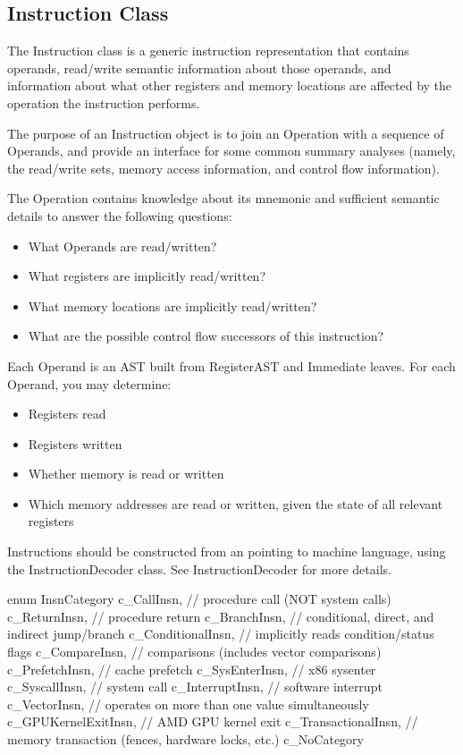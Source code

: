\subsection{Instruction Class}
\label{sec:instruction}
The Instruction class is a generic instruction representation that contains
operands, read/write semantic information about those operands, and information
about what other registers and memory locations are affected by the operation
the instruction performs.

The purpose of an Instruction object is to join an Operation with a sequence of
Operands, and provide an interface for some common summary analyses (namely, the
read/write sets, memory access information, and control flow information).

The Operation contains knowledge about its mnemonic and sufficient semantic
details to answer the following questions:
\begin{itemize}
\item What Operands are read/written?
\item What registers are implicitly read/written?
\item What memory locations are implicitly read/written?
\item What are the possible control flow successors of this instruction?
\end{itemize}

Each Operand is an AST built from RegisterAST and Immediate leaves. For each Operand, you may determine:
\begin{itemize}
\item Registers read
\item Registers written
\item Whether memory is read or written
\item Which memory addresses are read or written, given the state of all relevant registers
\end{itemize}

Instructions should be constructed from an  
pointing to machine language, using the InstructionDecoder class.  See
InstructionDecoder for more details. 

\begin{apient}
enum InsnCategory {
  c_CallInsn,          // procedure call (NOT system calls)
  c_ReturnInsn,        // procedure return
  c_BranchInsn,        // conditional, direct, and indirect jump/branch
  c_ConditionalInsn,   // implicitly reads condition/status flags
  c_CompareInsn,       // comparisons (includes vector comparisons)
  c_PrefetchInsn,      // cache prefetch
  c_SysEnterInsn,      // x86 sysenter
  c_SyscallInsn,       // system call
  c_InterruptInsn,     // software interrupt
  c_VectorInsn,        // operates on more than one value simultaneously
  c_GPUKernelExitInsn, // AMD GPU kernel exit
  c_TransactionalInsn, // memory transaction (fences, hardware locks, etc.)
  c_NoCategory
}
\end{apient}


